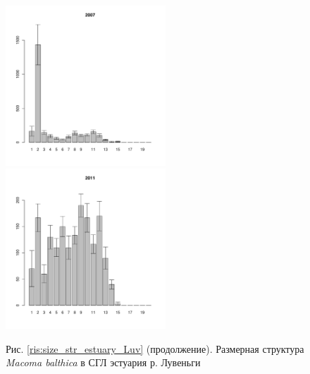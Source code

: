 \documentclass[12pt, a4paper]{article}
\begin{document}
\begin{figure}[h]

\begin{multicols}{3}
\hfill
\includegraphics[width=60mm]{../White_Sea/Estuatiy_Luvenga/sizestr_2007_.pdf}
\hfill
\includegraphics[width=60mm]{../White_Sea/Estuatiy_Luvenga/sizestr_2011_.pdf}
\end{multicols}


\begin{center}
Рис. \ref{ris:size_str_estuary_Luv} (продолжение). Размерная структура {\it Macoma balthica} в СГЛ эстуария р. Лувеньги

\end{center}
\end{figure}
\end{document}
